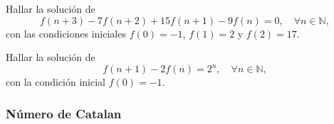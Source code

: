 \begin{frame}

\begin{example}
	Hallar la solución de \[ f(n+3)-7f(n+2)+15f(n+1)-9f(n)=0,\quad\forall n\in\mathds{N}, \] con las condiciones iniciales $f(0)=-1$,  $f(1)=2$ y $f(2)=17$.
\end{example}

\begin{example}[E.D.L.C]
	Hallar la solución de \[ f(n+1)-2f(n)=2^{n},\quad\forall n\in\mathds{N}, \] con la condición inicial $f(0)=-1$.
\end{example}
\end{frame}
%	


\subsubsection{Número de Catalan}

